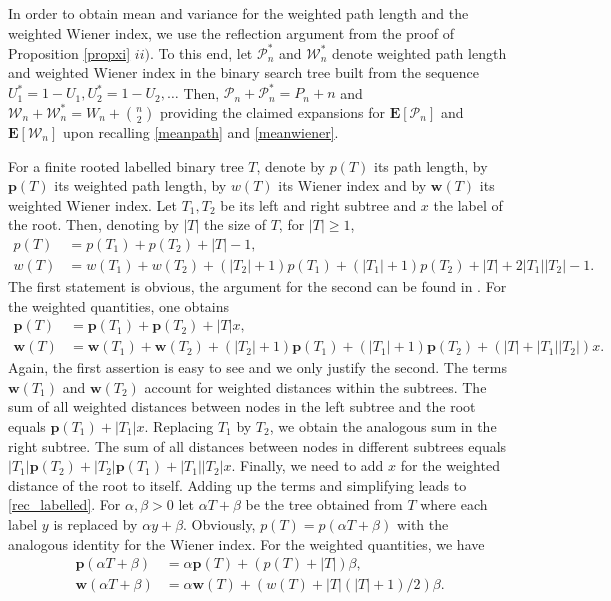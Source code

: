 \documentclass{amsart}       %
\newcommand{\Ew}{\ensuremath{\mathcal P}}
\newcommand{\Ww}{\ensuremath{\mathcal W}}
\newcommand{\ew}{\ensuremath{\mathbf p}}
\newcommand{\ww}{\ensuremath{\mathbf w}}
\newcommand{\E}[1]{\ensuremath{\mathbf{E} \left[#1 \right]}}
\begin{document}
In order to obtain mean and variance for the weighted path length and the weighted Wiener index, we use  the reflection argument  from the proof of Proposition \ref{propxi} $ii)$. To this end, let $\Ew_n^*$ and $\Ww_n^*$ denote weighted path length and weighted Wiener index in the binary search tree built from the sequence $U_1^* = 1-U_1, U_2^* = 1-U_2, \ldots$ Then, $\Ew_n + \Ew_n^* = P_n + n$ and $\Ww_n + \Ww_n^* =  W_n + {n \choose 2}$ providing the claimed expansions for $\E{\Ew_n}$ and $\E{\Ww_n}$ upon recalling \eqref{meanpath} and \eqref{meanwiener}.

For a finite rooted labelled binary tree $T$, denote by $p(T)$ its path length, by $\ew(T)$ its weighted path length, by $w(T)$ its Wiener index and by $\ww(T)$ its weighted Wiener index. Let $T_1, T_2$ be its left and right subtree and $x$ the label of the root. Then, denoting by $|T|$ the size of $T$, for $|T| \geq 1$,
\begin{align}
p(T) & = p(T_1) + p(T_2) + |T|-1, \label{rec_unlabelled} \\
w(T) & = w(T_1) + w(T_2) + (|T_2| + 1) p(T_1) + (|T_1| + 1) p(T_2) + |T| + 2 |T_1| |T_2| -1.
\end{align}
The first statement is obvious, the argument for the second can be found in \cite{newiener}. For the weighted quantities, one obtains
\begin{align}
\ew(T) & = \ew(T_1) + \ew(T_2) + |T| x,  \\
\ww(T) & = \ww(T_1) + \ww(T_2) + (|T_2| + 1) \ew(T_1) + (|T_1| + 1) \ew(T_2) + (|T| +  |T_1| |T_2|)x. \label{rec_labelled}
\end{align}
Again, the first assertion is easy to see and we only justify the second. The terms $\ww(T_1)$ and $\ww(T_2)$ account for weighted distances within the subtrees. The sum of all weighted distances between nodes in the left subtree and the root equals $\ew(T_1) + |T_1|x$. Replacing $T_1$ by $T_2$, we obtain the analogous sum in the right subtree. The sum of all distances between nodes in different subtrees equals $|T_1| \ew(T_2) + |T_2| \ew(T_1) + |T_1| |T_2| x$. Finally, we need to add $x$ for the weighted distance of the root to itself. Adding up the terms and simplifying leads to \eqref{rec_labelled}.
For $\alpha, \beta > 0$ let $\alpha T + \beta$ be the tree obtained from $T$ where each label $y$ is replaced by $\alpha y + \beta$. Obviously, $p(T) = p(\alpha T +\beta)$ with the analogous identity for the Wiener index. For the weighted quantities, we have
\begin{align}
\ew(\alpha T + \beta ) & = \alpha \ew(T) + (p(T) + |T|) \beta,  \\
\ww(\alpha T + \beta) & = \alpha \ww(T) + (w(T) + |T|(|T| + 1)/2) \beta. \label{conn_factor}
\end{align}
\end{document}
